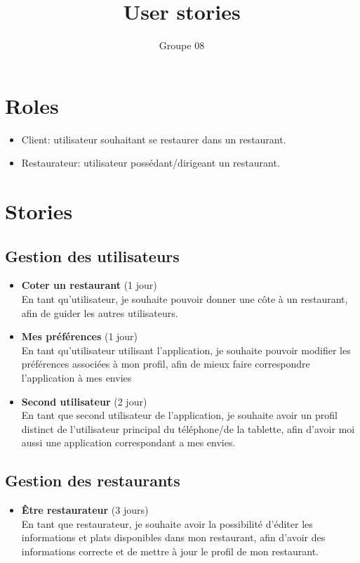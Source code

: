 \documentclass[10pt,a4paper]{article}
\title{User stories}
\author{Groupe 08}
\begin{document}
\maketitle
\section{Roles}
\begin{itemize}
\item Client: utilisateur souhaitant se restaurer dans un restaurant.
\item Restaurateur: utilisateur possédant/dirigeant un restaurant.
\end{itemize}
\section{Stories}
\subsection{Gestion des utilisateurs}
\begin{itemize}
\item \textbf{Coter un restaurant} (1 jour)\\
En tant qu'utilisateur, je souhaite pouvoir donner une côte à un restaurant, afin de guider les autres utilisateurs.
\item \textbf{Mes préférences} (1 jour)\\
En tant qu'utilisateur utilisant l'application, je souhaite pouvoir modifier les préférences associées à mon profil, afin de mieux faire correspondre l'application à mes envies
\item \textbf{Second utilisateur} (2 jour)\\
En tant que second utilisateur de l'application, je souhaite avoir un profil distinct de l'utilisateur principal du téléphone/de la tablette, afin d'avoir moi aussi une application correspondant a mes envies.
\end{itemize}
\subsection{Gestion des restaurants}
\begin{itemize}
\item \textbf{Être restaurateur} (3 jours)\\
En tant que restaurateur, je souhaite avoir la possibilité d'éditer les informations et plats disponibles dans mon restaurant, afin d'avoir des informations correcte et de mettre à jour le profil de mon restaurant.
\end{itemize}
\end{document}
